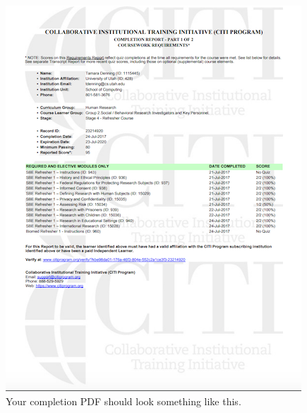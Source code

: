 \documentclass{article}
\begin{document}
    \begin{figure}[h!]
    \centering
    \includegraphics[scale=1.0]{CITI-completion-report}
    \caption{Your completion PDF should look something like this.}
    \end{figure}
\end{document}
